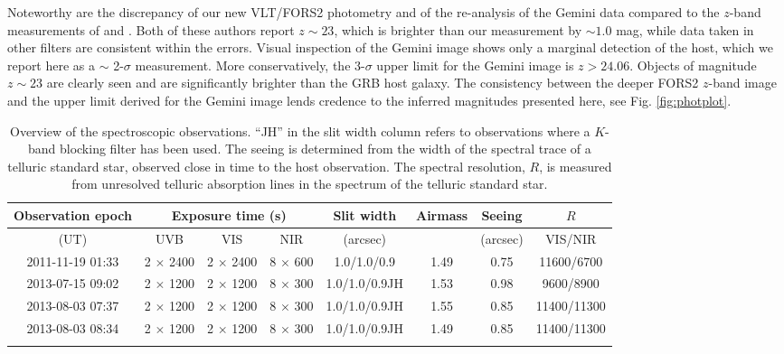 \documentclass[longauth]{aa}    %
\begin{document}
Noteworthy are the discrepancy of  our new VLT/FORS2 photometry and of the
re-analysis of the Gemini data compared to the $z$-band measurements of
\citet{Margutti2012} and \citet{Sakamoto2013}. Both of these authors report $z
\sim 23$, which is brighter than our measurement by $\sim 1.0$ mag, while data
taken in other filters are consistent within the errors. Visual inspection of
the Gemini image shows only a marginal detection of the host, which we report
here as a $\sim$ 2-$\sigma$ measurement. More conservatively, the 3-$\sigma$
upper limit for the Gemini image is $z > 24.06$. Objects of magnitude $z \sim
23$ are clearly seen and are significantly brighter than the GRB host galaxy.
The consistency between the deeper FORS2 $z$-band image and the upper limit
derived for the Gemini image lends credence to the inferred magnitudes presented
here, see Fig. \ref{fig:photplot}.

\begin{table}[!h]
	
	\centering
	\caption{Overview of the spectroscopic observations. ``JH'' in the slit width column refers to observations where a $K$-band blocking filter has been used. The seeing is determined from the width of the spectral trace of a telluric standard star, observed close in time to the host observation. The spectral resolution, $R$, is measured from unresolved telluric absorption lines in the spectrum of the telluric standard star. \label{tab:spec_overview}}
	\begin{tabular}{cccccccc}
		\hline\hline
		{Observation epoch} &  \multicolumn{3}{c}{Exposure time (s)} & Slit width & Airmass & Seeing & $R$   \\ [1.5pt]
		\hline
		(UT) & UVB  & VIS & NIR &  (arcsec)   & {} & (arcsec)  & {VIS/NIR}  \\ [1.5pt]
		\hline
		2011-11-19 01:33 & 2 $\times$ 2400 & 2 $\times$ 2400 & 8 $\times$ 600 & 1.0/1.0/0.9 & 1.49 & 0.75 & 11600/6700 \\
		2013-07-15 09:02 & 2 $\times$ 1200 & 2 $\times$ 1200 & 8 $\times$ 300 & 1.0/1.0/0.9JH & 1.53 & 0.98 & 9600/8900 \\
		2013-08-03 07:37 & 2 $\times$ 1200 & 2 $\times$ 1200 & 8 $\times$ 300 & 1.0/1.0/0.9JH & 1.55 & 0.85 & 11400/11300 \\
		2013-08-03 08:34 & 2 $\times$ 1200 & 2 $\times$ 1200 & 8 $\times$ 300 & 1.0/1.0/0.9JH & 1.49 & 0.85 & 11400/11300 \\
		
		\hline\noalign{\smallskip}
		
	\end{tabular}
	
\end{table}
\end{document}
